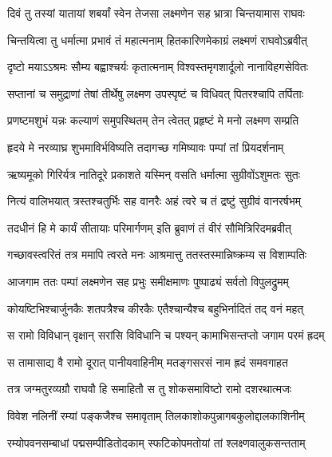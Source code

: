
\twolineshloka
{दिवं तु तस्यां यातायां शबर्यां स्वेन तेजसा}
{लक्ष्मणेन सह भ्रात्रा चिन्तयामास राघवः} %

\twolineshloka
{चिन्तयित्वा तु धर्मात्मा प्रभावं तं महात्मनाम्}
{हितकारिणमेकाग्रं लक्ष्मणं राघवोऽब्रवीत्} %

\twolineshloka
{दृष्टो मयाऽऽश्रमः सौम्य बह्वाश्चर्यः कृतात्मनाम्}
{विश्वस्तमृगशार्दूलो नानाविहगसेवितः} %

\twolineshloka
{सप्तानां च समुद्राणां तेषां तीर्थेषु लक्ष्मण}
{उपस्पृष्टं च विधिवत् पितरश्चापि तर्पिताः} %

\twolineshloka
{प्रणष्टमशुभं यन्नः कल्याणं समुपस्थितम्}
{तेन त्वेतत् प्रहृष्टं मे मनो लक्ष्मण सम्प्रति} %

\twolineshloka
{हृदये मे नरव्याघ्र शुभमाविर्भविष्यति}
{तदागच्छ गमिष्यावः पम्पां तां प्रियदर्शनाम्} %

\twolineshloka
{ऋष्यमूको गिरिर्यत्र नातिदूरे प्रकाशते}
{यस्मिन् वसति धर्मात्मा सुग्रीवोंऽशुमतः सुतः} %

\twolineshloka
{नित्यं वालिभयात् त्रस्तश्चतुर्भिः सह वानरैः}
{अहं त्वरे च तं द्रष्टुं सुग्रीवं वानरर्षभम्} %

\twolineshloka
{तदधीनं हि मे कार्यं सीतायाः परिमार्गणम्}
{इति ब्रुवाणं तं वीरं सौमित्रिरिदमब्रवीत्} %

\twolineshloka
{गच्छावस्त्वरितं तत्र ममापि त्वरते मनः}
{आश्रमात्तु ततस्तस्मान्निष्क्रम्य स विशाम्पतिः} %

\twolineshloka
{आजगाम ततः पम्पां लक्ष्मणेन सह प्रभुः}
{समीक्षमाणः पुष्पाढ्यं सर्वतो विपुलद्रुमम्} %

\twolineshloka
{कोयष्टिभिश्चार्जुनकैः शतपत्रैश्च कीरकैः}
{एतैश्चान्यैश्च बहुभिर्नादितं तद् वनं महत्} %

\twolineshloka
{स रामो विविधान् वृक्षान् सरांसि विविधानि च}
{पश्यन् कामाभिसन्तप्तो जगाम परमं ह्रदम्} %

\twolineshloka
{स तामासाद्य वै रामो दूरात् पानीयवाहिनीम्}
{मतङ्गसरसं नाम ह्रदं समवगाहत} %

\twolineshloka
{तत्र जग्मतुरव्यग्रौ राघवौ हि समाहितौ}
{स तु शोकसमाविष्टो रामो दशरथात्मजः} %

\twolineshloka
{विवेश नलिनीं रम्यां पङ्कजैश्च समावृताम्}
{तिलकाशोकपुन्नागबकुलोद्दालकाशिनीम्} %

\twolineshloka
{रम्योपवनसम्बाधां पद्मसम्पीडितोदकाम्}
{स्फटिकोपमतोयां तां श्लक्ष्णवालुकसन्तताम्} %

